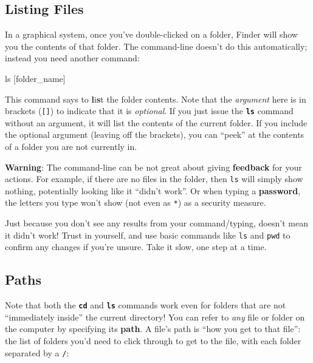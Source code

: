 \documentclass[]{book}
\newenvironment{Shaded}{\begin{snugshade}}{\end{snugshade}}
\newcommand{\FunctionTok}[1]{\textcolor[rgb]{0.00,0.00,0.00}{#1}}
\newcommand{\NormalTok}[1]{#1}
\theoremstyle{definition}
\theoremstyle{definition}
\theoremstyle{remark}
\begin{document}
\subsection{Listing Files}\label{listing-files}

In a graphical system, once you've double-clicked on a folder, Finder
will show you the contents of that folder. The command-line doesn't do
this automatically; instead you need another command:

\begin{Shaded}
\begin{Highlighting}[]
\FunctionTok{ls}\NormalTok{ [folder_name]}
\end{Highlighting}
\end{Shaded}

This command says to \textbf{l}i\textbf{s}t the folder contents. Note
that the \emph{argument} here is in brackets (\texttt{{[}{]}}) to
indicate that it is \emph{optional}. If you just issue the
\textbf{\texttt{ls}} command without an argument, it will list the
contents of the current folder. If you include the optional argument
(leaving off the brackets), you can ``peek'' at the contents of a folder
you are not currently in.

\textbf{Warning}: The command-line can be not great about giving
\textbf{feedback} for your actions. For example, if there are no files
in the folder, then \texttt{ls} will simply show nothing, potentially
looking like it ``didn't work''. Or when typing a \textbf{password}, the
letters you type won't show (not even as \texttt{*}) as a security
measure.

Just because you don't see any results from your command/typing, doesn't
mean it didn't work! Trust in yourself, and use basic commands like
\texttt{ls} and \texttt{pwd} to confirm any changes if you're unsure.
Take it slow, one step at a time.

\subsection{Paths}\label{paths}

Note that both the \textbf{\texttt{cd}} and \textbf{\texttt{ls}}
commands work even for folders that are not ``immediately inside'' the
current directory! You can refer to \emph{any} file or folder on the
computer by specifying its \textbf{path}. A file's path is ``how you get
to that file'': the list of folders you'd need to click through to get
to the file, with each folder separated by a \texttt{/}:
\end{document}
